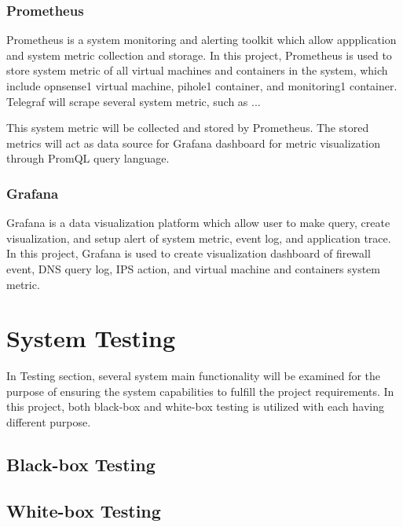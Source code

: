\documentclass[../index.tex]{subfiles}
\begin{document}
\subsubsection{Prometheus}

Prometheus is a system monitoring and alerting toolkit which allow appplication and system metric
collection and storage. In this project, Prometheus is used to store system metric of all virtual
machines and containers in the system, which include opnsense1 virtual machine, pihole1 container,
and monitoring1 container. Telegraf will scrape several system metric, such as ...

This system metric  will be collected and stored by Prometheus. The stored metrics will act as data
source for Grafana dashboard for metric visualization through PromQL query language.

\subsubsection{Grafana}

Grafana is a data visualization platform which allow user to make query, create visualization, and
setup alert of system metric, event log, and application trace. In this project, Grafana is used to
create visualization dashboard of firewall event, DNS query log, IPS action, and virtual machine and
containers system metric.

\section{System Testing}

In Testing section, several system main functionality will be examined for the purpose of ensuring
the system capabilities to fulfill the project requirements. In this project, both black-box and
white-box testing is utilized with each having different purpose.

\subsection{Black-box Testing}

\subsection{White-box Testing}

\end{document}
